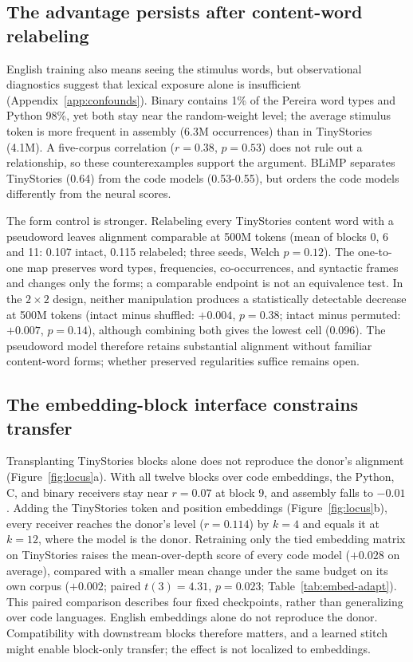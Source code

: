 \documentclass[mlmain]{jmlr}
\begin{document}
\subsection{The advantage persists after content-word relabeling}
\label{sec:results-confounds}

English training also means seeing the stimulus words, but observational diagnostics suggest that lexical exposure alone is insufficient (Appendix~\ref{app:confounds}). Binary contains 1\% of the Pereira word types and Python 98\%, yet both stay near the random-weight level; the average stimulus token is more frequent in assembly (6.3M occurrences) than in TinyStories (4.1M). A five-corpus correlation ($r = 0.38$, $p = 0.53$) does not rule out a relationship, so these counterexamples support the argument. BLiMP separates TinyStories (0.64) from the code models (0.53-0.55), but orders the code models differently from the neural scores.

The form control is stronger. Relabeling every TinyStories content word with a pseudoword leaves alignment comparable at 500M tokens (mean of blocks 0, 6 and 11: 0.107 intact, 0.115 relabeled; three seeds, Welch $p = 0.12$). The one-to-one map preserves word types, frequencies, co-occurrences, and syntactic frames and changes only the forms; a comparable endpoint is not an equivalence test. In the $2\times2$ design, neither manipulation produces a statistically detectable decrease at 500M tokens (intact minus shuffled: $+0.004$, $p = 0.38$; intact minus permuted: $+0.007$, $p = 0.14$), although combining both gives the lowest cell (0.096). The pseudoword model therefore retains substantial alignment without familiar content-word forms; whether preserved regularities suffice remains open.

\subsection{The embedding-block interface constrains transfer}
\label{sec:results-locus}

Transplanting TinyStories blocks alone does not reproduce the donor's alignment (Figure~\ref{fig:locus}a). With all twelve blocks over code embeddings, the Python, C, and binary receivers stay near $r = 0.07$ at block 9, and assembly falls to $-0.01$. Adding the TinyStories token and position embeddings (Figure~\ref{fig:locus}b), every receiver reaches the donor's level ($r = 0.114$) by $k = 4$ and equals it at $k = 12$, where the model is the donor. Retraining only the tied embedding matrix on TinyStories raises the mean-over-depth score of every code model ($+0.028$ on average), compared with a smaller mean change under the same budget on its own corpus ($+0.002$; paired $t(3) = 4.31$, $p = 0.023$; Table~\ref{tab:embed-adapt}). This paired comparison describes four fixed checkpoints, rather than generalizing over code languages. English embeddings alone do not reproduce the donor. Compatibility with downstream blocks therefore matters, and a learned stitch might enable block-only transfer; the effect is not localized to embeddings.
\end{document}
